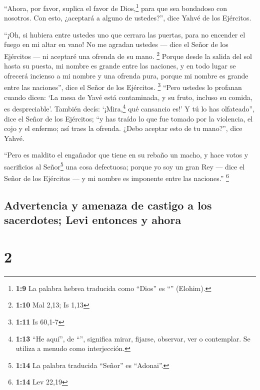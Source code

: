  ``Ahora, por favor, suplica el favor de Dios,\footnote{\textbf{1:9}
  La palabra hebrea traducida como ``Dios'' es ``''
  (Elohim).} para que sea bondadoso con nosotros. Con esto, ¿aceptará a
alguno de ustedes?'', dice Yahvé de los Ejércitos.

 ``¡Oh, si hubiera entre ustedes uno que cerrara las
puertas, para no encender el fuego en mi altar en vano! No me agradan
ustedes --- dice el Señor de los Ejércitos --- ni aceptaré una ofrenda
de su mano. \footnote{\textbf{1:10} Mal 2,13; Is 1,13} 
Porque desde la salida del sol hasta su puesta, mi nombre es grande
entre las naciones, y en todo lugar se ofrecerá incienso a mi nombre y
una ofrenda pura, porque mi nombre es grande entre las naciones'', dice
el Señor de los Ejércitos. \footnote{\textbf{1:11} Is 60,1-7}
 ``Pero ustedes lo profanan cuando dicen: `La mesa de
Yavé está contaminada, y su fruto, incluso su comida, es despreciable'.
 También decís: `¡Mira,\footnote{\textbf{1:13} ``He
  aquí'', de ``'', significa mirar, fijarse, observar, ver o
  contemplar. Se utiliza a menudo como interjección.} qué cansancio es!'
Y tú lo has olfateado'', dice el Señor de los Ejércitos; ``y has traído
lo que fue tomado por la violencia, el cojo y el enfermo; así traes la
ofrenda. ¿Debo aceptar esto de tu mano?'', dice Yahvé.

 ``Pero es maldito el engañador que tiene en su rebaño un
macho, y hace votos y sacrificios al Señor\footnote{\textbf{1:14} La
  palabra traducida ``Señor'' es ``Adonai''.} una cosa defectuosa;
porque yo soy un gran Rey --- dice el Señor de los Ejércitos --- y mi
nombre es imponente entre las naciones.'' \footnote{\textbf{1:14} Lev
  22,19}

\hypertarget{advertencia-y-amenaza-de-castigo-a-los-sacerdotes-levi-entonces-y-ahora}{%
\subsection{Advertencia y amenaza de castigo a los sacerdotes; Levi
entonces y
ahora}\label{advertencia-y-amenaza-de-castigo-a-los-sacerdotes-levi-entonces-y-ahora}}

\hypertarget{section-1}{%
\section{2}\label{section-1}}

